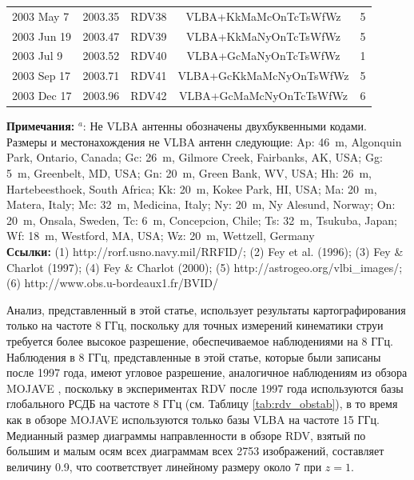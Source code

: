 \begin{table}
\begin{SingleSpace}
\begin{tabular}{lcccc}
2003 May 7  & 2003.35 & RDV38  & VLBA+KkMaMcOnTcTsWfWz     & 5   \\
2003 Jun 19 & 2003.47 & RDV39  & VLBA+KkMaNyOnTcTsWfWz     & 5   \\
2003 Jul 9  & 2003.52 & RDV40  & VLBA+GcMaNyOnTcTsWfWz     & 1   \\
2003 Sep 17 & 2003.71 & RDV41  & VLBA+GcKkMaMcNyOnTsWfWz   & 5   \\
2003 Dec 17 & 2003.96 & RDV42  & VLBA+GcMaMcNyOnTcTsWfWz   & 6   \\
\bottomrule
\end{tabular}
\end{SingleSpace}
\textbf{Примечания:}
$^a$: Не VLBA антенны обозначены двухбуквенными кодами.
Размеры и местонахождения не VLBA антенн следующие:
Ap: 46~m, Algonquin Park, Ontario, Canada;
Gc: 26~m, Gilmore Creek, Fairbanks, AK, USA;
Gg: 5~m, Greenbelt, MD, USA;
Gn: 20~m, Green Bank, WV, USA;
Hh: 26~m, Hartebeesthoek, South Africa;
Kk: 20~m, Kokee Park, HI, USA;
Ma: 20~m, Matera, Italy;
Mc: 32~m, Medicina, Italy;
Ny: 20~m, Ny Alesund, Norway;
On: 20~m, Onsala, Sweden,
Tc: 6~m, Concepcion, Chile;
Ts: 32~m, Tsukuba, Japan;
Wf: 18~m, Westford, MA, USA;
Wz: 20~m, Wettzell, Germany\\
\textbf{Ссылки:}
(1) http://rorf.usno.navy.mil/RRFID/;
(2) Fey et al. (1996);
(3) Fey \& Charlot (1997);
(4) Fey \& Charlot (2000);
(5) http://astrogeo.org/vlbi\_images/;
(6) http://www.obs.u-bordeaux1.fr/BVID/ \\
\end{table}

Анализ, представленный в этой статье, использует результаты картографирования только на частоте 8
ГГц, поскольку для точных измерений кинематики струи требуется более высокое разрешение,
обеспечиваемое наблюдениями на 8 ГГц. Наблюдения в 8 ГГц, представленные в этой статье, которые были
записаны после 1997 года, имеют угловое разрешение, аналогичное наблюдениям из обзора MOJAVE
\cite{Lister_2009a}, поскольку в экспериментах RDV после 1997 года используются базы глобального
РСДБ на частоте 8 ГГц (см. Таблицу \ref{tab:rdv_obstab}), в то время как в обзоре MOJAVE
используются
только базы VLBA на частоте 15 ГГц. Медианный размер диаграммы направленности в обзоре RDV, взятый
по большим и малым осям всех диаграммам всех 2753 изображений, составляет величину \SI{0.9}{\mas},
что соответствует линейному размеру около \SI{7}{\parsec} при $z = 1$.

